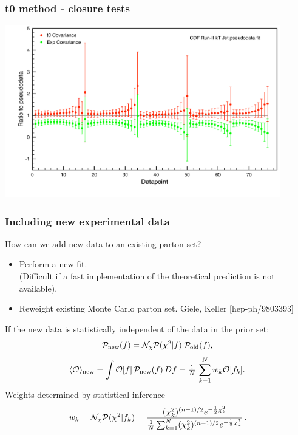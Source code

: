 \documentclass[10pt]{beamer}
\newcommand{\be}{\begin{equation*}}
\newcommand{\ee}{\end{equation*}}
\def\smallfrac#1#2{\hbox{${{#1}\over {#2}}$}}
\begin{document}

\begin{frame}
\frametitle{t0 method - closure tests}
   \includegraphics[width=0.9\textwidth]{figures/t0plot.pdf}
 \end{frame} 

\begin{frame}
\frametitle{Including new experimental data}
How can we add new data to an existing parton set?

\begin{itemize}
		\item<1-> Perform a new fit.\\
		{\small (Difficult if a fast implementation of the theoretical prediction is not available).}
		\item<1-> Reweight existing Monte Carlo parton set. {\small \color{blue} Giele, Keller [hep-ph/9803393] }\\
\end{itemize}
If the new data is statistically independent of the data in the prior set:
\be
\mathcal{P}_{\rm new}(f)
= \mathcal{N}_{\chi}\mathcal{P}(\chi^2|f)\;\mathcal{P}_{\rm old}(f),
\ee
		\be \langle\mathcal{O}\rangle_{\mathrm {new}}=\int \mathcal{O}[f] \, \mathcal{P}_{ \mathrm {new}}(f)\,Df=\smallfrac{1}{N}\,\sum_{k=1}^{N}w_k\mathcal{O}[f_k].\,  \ee
Weights determined by statistical inference
\be w_k =\mathcal{N}_\chi\mathcal{P}(\chi^2|f_k) = 
\frac{(\chi^{2}_k)^{(n-1)/2} 
e^{-\frac{1}{2}\chi^{2}_k}}
{\smallfrac{1}{N}\sum_{k=1}^{N}(\chi^{2}_k)^{(n-1)/2}
e^{-\frac{1}{2}\chi^{2}_k}}\, .\ee
{}

\end{frame}
\end{document}
